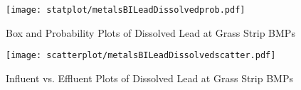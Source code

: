         \begin{figure}[hb]   %
            \centering
            \texttt{[image: statplot/metalsBILeadDissolvedprob.pdf]}
            \caption{Box and Probability Plots of Dissolved Lead at Grass Strip BMPs}
        \end{figure}         %
        
        
        \begin{figure}[hb]   %
            \centering
            \texttt{[image: scatterplot/metalsBILeadDissolvedscatter.pdf]}
            \caption{Influent vs. Effluent Plots of Dissolved Lead at Grass Strip BMPs}
        \end{figure}         %
        \clearpage
        